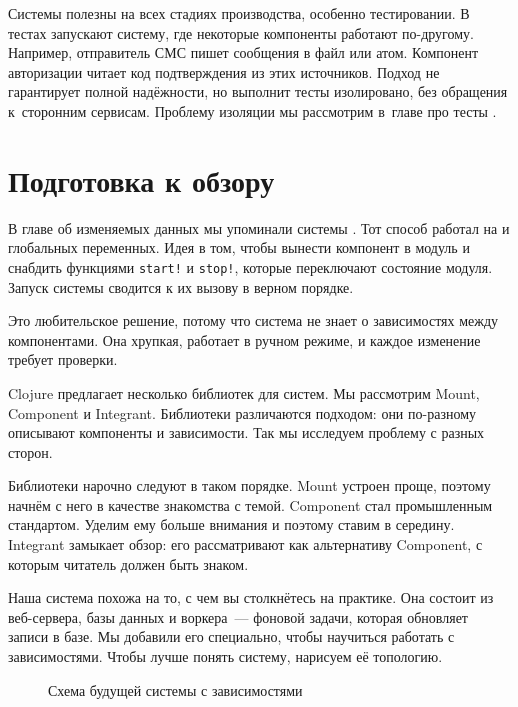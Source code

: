 Системы полезны на всех стадиях производства, особенно тестировании. В тестах
запускают систему, где некоторые компоненты работают по-другому. Например,
отправитель СМС пишет сообщения в файл или атом. Компонент авторизации читает
код подтверждения из этих источников. Подход не гарантирует полной надёжности,
но выполнит тесты изолировано, без обращения к~сторонним сервисам. Проблему
изоляции мы рассмотрим в~главе про тесты .

\section{Подготовка к обзору}


В главе об изменяемых данных мы упоминали системы . Тот
способ работал на  и глобальных переменных. Идея в том,
чтобы вынести компонент в модуль и снабдить функциями \verb|start!| и
\verb|stop!|, которые переключают состояние модуля. Запуск системы сводится к их
вызову в верном порядке.

Это любительское решение, потому что система не знает о зависимостях между
компонентами. Она хрупкая, работает в ручном режиме, и каждое изменение требует
проверки.

Clojure предлагает несколько библиотек для систем. Мы рассмотрим Mount,
Component и Integrant. Библиотеки различаются подходом: они по-разному описывают
компоненты и зависимости. Так мы исследуем проблему с разных сторон.

Библиотеки нарочно следуют в таком порядке. Mount устроен проще, поэтому начнём
с него в качестве знакомства с темой. Component стал промышленным
стандартом. Уделим ему больше внимания и поэтому ставим в середину. Integrant
замыкает обзор: его рассматривают как альтернативу Component, с которым читатель
должен быть знаком.

Наша система похожа на то, с чем вы столкнётесь на практике. Она состоит из
веб-сервера, базы данных и воркера~--- фоновой задачи, которая обновляет записи
в базе. Мы добавили его специально, чтобы научиться работать с
зависимостями. Чтобы лучше понять систему, нарисуем её топологию\iflarge\else\xspace{}\fi.

\label{demo-system}

\begin{figure}[ht!]
  \caption{Схема будущей системы с зависимостями}
  \label{fig:chart-system}
\end{figure}

